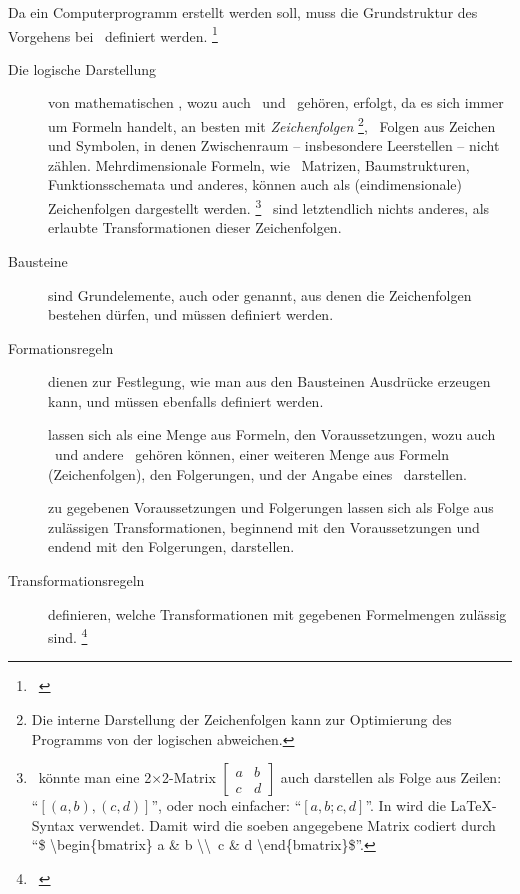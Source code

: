 Da ein Computerprogramm erstellt werden soll, muss die Grundstruktur des Vorgehens bei \Beweisen\ definiert werden.%
\footnote{\seename~\cite{bib:Kalkuel}}

\begin{description}
	\item[Die logische Darstellung] von mathematischen \Aussagen, wozu auch \Axiome\ und \Saetze\ gehören, erfolgt, da es sich immer um Formeln handelt, an besten mit \emph{Zeichenfolgen}%
	\footnote{%
		Die interne Darstellung der Zeichenfolgen kann zur Optimierung des Programms von der logischen abweichen.
	},
	\textdh\ Folgen aus Zeichen und Symbolen, in denen Zwischenraum -- insbesondere Leerstellen -- nicht zählen.
	Mehrdimensionale Formeln, wie \textzB\ Matrizen, Baumstrukturen, Funktionsschemata und anderes, können auch als (eindimensionale) Zeichenfolgen dargestellt werden.%
	\footnote{%
		\textZB\ könnte man eine 2$\times$2-Matrix
		$\begin{bmatrix} a & b \\ c & d \end{bmatrix}$
		auch darstellen als Folge aus Zeilen: \enquote{$[(a,b),(c,d)]$}, oder noch einfacher: \enquote{$[a,b;c,d]$}.
		In \ASBA wird die \LaTeX-Syntax verwendet.
		Damit wird die soeben angegebene Matrix codiert durch \enquote{\$ \textbackslash begin\{bmatrix\} a \& b \textbackslash\textbackslash\ c \& d \textbackslash end\{bmatrix\}\$}.
	}
	\Beweise\ sind letztendlich nichts anderes, als erlaubte Transformationen dieser Zeichenfolgen.
	\item[Bausteine] sind Grundelemente, auch  oder  genannt, aus denen die Zeichenfolgen bestehen dürfen, und müssen definiert werden.
	\item[Formationsregeln] dienen zur Festlegung, wie man aus den Bausteinen Ausdrücke erzeugen kann, und müssen ebenfalls definiert werden.
	\item[\Saetze] lassen sich als eine Menge aus Formeln, den Voraussetzungen, wozu auch \Axiome\ und andere \Saetze\ gehören können, einer weiteren Menge aus Formeln (Zeichenfolgen), den Folgerungen, und der Angabe eines \Beweises\ darstellen.
	\item[\Beweise] zu gegebenen Voraussetzungen und Folgerungen lassen sich als Folge aus zulässigen Transformationen, beginnend mit den Voraussetzungen und endend mit den Folgerungen, darstellen.
	\item[Transformationsregeln] definieren, welche Transformationen mit gegebenen Formelmengen zulässig sind.%
	\footnote{\seename~\cite{bib:Rautenberg,bib:Schlussregel,bib:NatuerlichesSchliessen}}
\end{description}

\Endchapter
